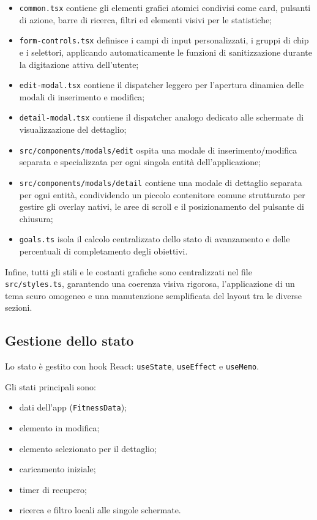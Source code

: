 \documentclass[11pt,a4paper]{article}
\begin{document}
\begin{itemize}
  \item \texttt{common.tsx} contiene gli elementi grafici atomici condivisi come card, pulsanti di azione, barre di ricerca, filtri ed elementi visivi per le statistiche;
  \item \texttt{form-controls.tsx} definisce i campi di input personalizzati, i gruppi di chip e i selettori, applicando automaticamente le funzioni di sanitizzazione durante la digitazione attiva dell'utente;
  \item \texttt{edit-modal.tsx} contiene il dispatcher leggero per l'apertura dinamica delle modali di inserimento e modifica;
  \item \texttt{detail-modal.tsx} contiene il dispatcher analogo dedicato alle schermate di visualizzazione del dettaglio;
  \item \texttt{src/components/modals/edit} ospita una modale di inserimento/modifica separata e specializzata per ogni singola entità dell'applicazione;
  \item \texttt{src/components/modals/detail} contiene una modale di dettaglio separata per ogni entità, condividendo un piccolo contenitore comune strutturato per gestire gli overlay nativi, le aree di scroll e il posizionamento del pulsante di chiusura;
  \item \texttt{goals.ts} isola il calcolo centralizzato dello stato di avanzamento e delle percentuali di completamento degli obiettivi.
\end{itemize}

Infine, tutti gli stili e le costanti grafiche sono centralizzati nel file \texttt{src/styles.ts}, garantendo una coerenza visiva rigorosa, l'applicazione di un tema scuro omogeneo e una manutenzione semplificata del layout tra le diverse sezioni.

\subsection{Gestione dello stato}

Lo stato è gestito con hook React: \texttt{useState}, \texttt{useEffect} e \texttt{useMemo}.

Gli stati principali sono:

\begin{itemize}
  \item dati dell'app (\texttt{FitnessData});
  \item elemento in modifica;
  \item elemento selezionato per il dettaglio;
  \item caricamento iniziale;
  \item timer di recupero;
  \item ricerca e filtro locali alle singole schermate.
\end{itemize}
\end{document}
